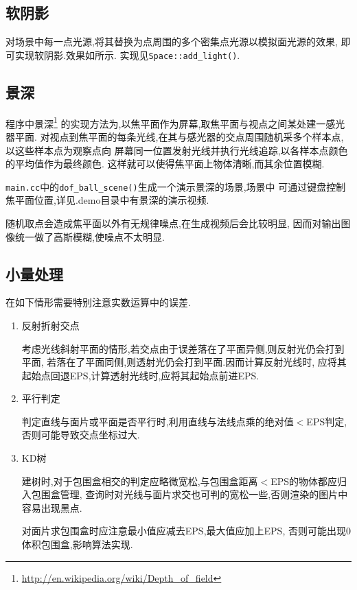 \subsection{软阴影}
\label{sec:soft}
对场景中每一点光源,将其替换为点周围的多个密集点光源以模拟面光源的效果,
即可实现软阴影.效果如所示. 实现见\verb|Space::add_light()|.

\subsection{景深}
程序中景深\footnote{\url{http://en.wikipedia.org/wiki/Depth\_of\_field}}
的实现方法为,以焦平面作为屏幕,取焦平面与视点之间某处建一感光器平面.
对视点到焦平面的每条光线,在其与感光器的交点周围随机采多个样本点,以这些样本点为观察点向
屏幕同一位置发射光线并执行光线追踪,以各样本点颜色的平均值作为最终颜色.
这样就可以使得焦平面上物体清晰,而其余位置模糊.


\verb|main.cc|中的\verb|dof_ball_scene()|生成一个演示景深的场景,场景中
可通过键盘控制焦平面位置,详见.demo目录中有景深的演示视频.

随机取点会造成焦平面以外有无规律噪点,在生成视频后会比较明显,
因而对输出图像统一做了高斯模糊,使噪点不太明显.

\subsection{小量处理}
在如下情形需要特别注意实数运算中的误差.
\begin{enumerate}
  \item 反射折射交点

    考虑光线斜射平面的情形,若交点由于误差落在了平面异侧,则反射光仍会打到平面,
    若落在了平面同侧,则透射光仍会打到平面.因而计算反射光线时,
    应将其起始点回退EPS,计算透射光线时,应将其起始点前进EPS.

  \item 平行判定

    判定直线与面片或平面是否平行时,利用直线与法线点乘的绝对值$<$EPS判定,
    否则可能导致交点坐标过大.

  \item KD树

    建树时,对于包围盒相交的判定应略微宽松,与包围盒距离$<$EPS的物体都应归入包围盒管理,
    查询时对光线与面片求交也可判的宽松一些,否则渲染的图片中容易出现黑点.

    对面片求包围盒时应注意最小值应减去EPS,最大值应加上EPS,
    否则可能出现0体积包围盒,影响算法实现.
\end{enumerate}

